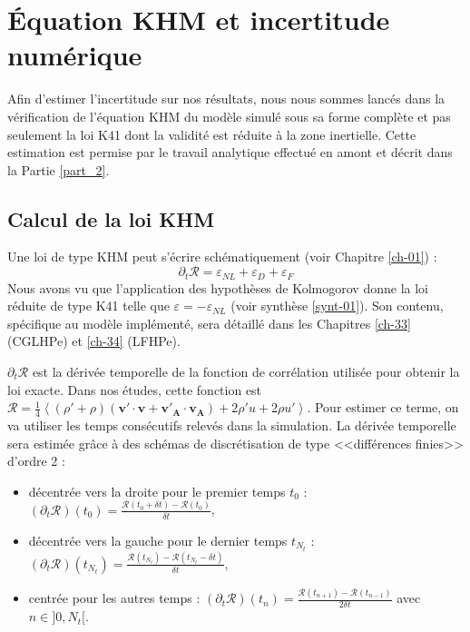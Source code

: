 \section{Équation \acs{KHM} et incertitude numérique} 
\label{sec-323}

Afin d'estimer l'incertitude sur nos résultats, nous nous sommes lancés dans la vérification de l'équation \acs{KHM} du modèle simulé sous sa forme complète et pas seulement la loi \acs{K41} dont la validité est réduite à la zone inertielle. Cette estimation est permise par le travail analytique effectué en amont et décrit dans la Partie \ref{part_2}.

\subsection{Calcul de la loi \acs{KHM}}
Une loi de type KHM peut s'écrire schématiquement (voir Chapitre \ref{ch-01}) : 
\begin{equation}
 \label{eq:scheme_KHM_simu}   \partial_t \mathcal{R} =  \varepsilon_{NL} + \varepsilon_{D} + \varepsilon_{F}
\end{equation}
Nous avons vu que l'application des hypothèses de Kolmogorov donne la loi réduite de type \acs{K41} telle que $\varepsilon = - \varepsilon_{NL}$ (voir synthèse \ref{synt-01}). Son contenu, spécifique au modèle implémenté, sera détaillé dans les Chapitres \ref{ch-33} (\acs{CGLHPe}) et \ref{ch-34} (\acs{LFHPe}). 

$ \partial_t \mathcal{R}$ est la dérivée temporelle de la fonction de corrélation utilisée pour obtenir la loi exacte. Dans nos études, cette fonction est  $ \mathcal{R} =\frac{1}{4} \left< (\rho'+\rho) (\boldsymbol{v'} \cdot  \boldsymbol{v} +  \boldsymbol{v'_A} \cdot  \boldsymbol{v_A}) + 2\rho' u + 2 \rho u'\right>$. Pour estimer ce terme, on va utiliser les temps consécutifs relevés dans la simulation. La dérivée temporelle sera estimée grâce à des schémas de discrétisation de type <<différences finies>> d'ordre 2 : 
\begin{itemize}
    \item décentrée vers la droite pour le premier temps $t_0$ : $ (\partial_t \mathcal{R})(t_0) = \frac{\mathcal{R}(t_0 + \delta t) - \mathcal{R}(t_0)}{\delta t}$,
    \item décentrée vers la gauche pour le dernier temps $t_{N_t}$ : $ (\partial_t \mathcal{R})(t_{N_t}) = \frac{\mathcal{R}(t_{N_t}) - \mathcal{R}(t_{N_t}-\delta t)}{\delta t}$,
    \item centrée pour les autres temps :  $ (\partial_t \mathcal{R})(t_n) = \frac{\mathcal{R}(t_{n+1}) - \mathcal{R}(t_{n-1}) }{2\delta t}$ avec $n\in ]0,N_t[$.
\end{itemize}

